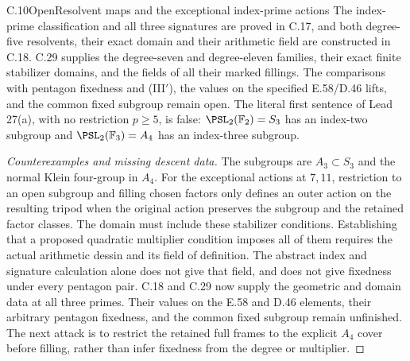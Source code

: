\begin{statement}{C.10}{Open}{Resolvent maps and the exceptional index-prime actions}
The index-prime classification and all three signatures are
proved in C.17, and both degree-five resolvents, their exact
domain and their arithmetic field are constructed in C.18.
C.29 supplies the degree-seven and degree-eleven families,
their exact finite stabilizer domains, and the fields of
all their marked fillings. The comparisons with pentagon
fixedness and (III$'$), the values on the specified
E.58/D.46 lifts, and the common fixed subgroup remain open.
The literal first
sentence of Lead 27(a), with no restriction $p\geq5$, is false:
$\PSL_2(\mathbb F_2)=S_3$ has an index-two subgroup and
$\PSL_2(\mathbb F_3)=A_4$ has an index-three subgroup.
\end{statement}
\begin{proof}[Counterexamples and missing descent data]
The subgroups are $A_3\subset S_3$ and the normal Klein four-group
in $A_4$. For the exceptional actions at $7,11$, restriction to
an open subgroup and filling chosen factors only defines an outer
action on the resulting tripod when the original action preserves
the subgroup and the retained factor classes. The domain must
include these stabilizer conditions. Establishing that a proposed
quadratic multiplier condition imposes all of them requires the
actual arithmetic dessin and its field of definition. The abstract
index and signature calculation alone does not give that field,
and does not give fixedness under every pentagon pair. C.18
and C.29 now supply the geometric and domain data at all
three primes. Their values on the E.58 and D.46 elements,
their arbitrary pentagon fixedness, and the common fixed
subgroup remain unfinished. The next attack is to restrict the retained
full frames to the explicit $A_4$ cover before filling,
rather than infer fixedness from the degree or multiplier.
\end{proof}

